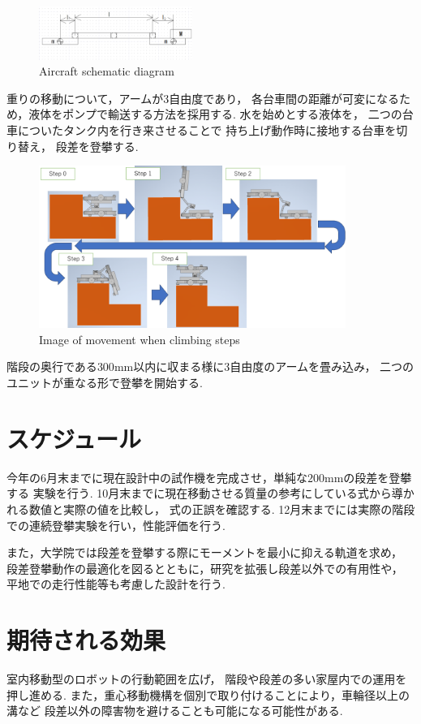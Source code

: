 \documentclass[dvipdfmx]{jsarticle}
\begin{document}
\begin{figure}[H]
  \centering
  \includegraphics[width=50mm]{image/model01}
  \caption{Aircraft schematic diagram}
\label{fig:model01}
\end{figure}

重りの移動について，アームが3自由度であり，
各台車間の距離が可変になるため，液体をポンプで輸送する方法を採用する.
水を始めとする液体を，
二つの台車についたタンク内を行き来させることで
持ち上げ動作時に接地する台車を切り替え，
段差を登攀する.
\begin{figure}[H]
\centering
\includegraphics[width=100mm]{image/flow}
\caption{Image of movement when climbing steps}
\label{fig:model02}
\end{figure}




階段の奥行である$300\mathrm{mm}$以内に収まる様に3自由度のアームを畳み込み，
二つのユニットが重なる形で登攀を開始する.

\section{スケジュール}
今年の6月末までに現在設計中の試作機を完成させ，単純な$200\mathrm{mm}$の段差を登攀する
実験を行う.
10月末までに現在移動させる質量の参考にしている式から導かれる数値と実際の値を比較し，
式の正誤を確認する.
12月末までには実際の階段での連続登攀実験を行い，性能評価を行う.

また，大学院では段差を登攀する際にモーメントを最小に抑える軌道を求め，
段差登攀動作の最適化を図るとともに，研究を拡張し段差以外での有用性や，
平地での走行性能等も考慮した設計を行う.

\section{期待される効果}
室内移動型のロボットの行動範囲を広げ，
階段や段差の多い家屋内での運用を押し進める.
また，重心移動機構を個別で取り付けることにより，車輪径以上の溝など
段差以外の障害物を避けることも可能になる可能性がある.
\end{document}
